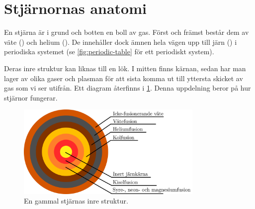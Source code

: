 \section{Stjärnornas anatomi}
En stjärna är i grund och botten en boll av gas. Först och främst består dem av väte () och helium (). De innehåller dock ämnen hela vägen upp till järn () i periodiska systemet (se \vref{fig:periodic-table} för ett periodiskt system).

Deras inre struktur kan liknas till en lök. I mitten finns kärnan, sedan har man lager av olika gaser och plasman för att sista komma ut till yttersta skicket av gas som vi ser utifrån. Ett diagram återfinns i \cref{fig:star-anatomy}. Denna uppdelning beror på hur stjärnor fungerar.

\begin{figure}[h!]
    \centering
    \includegraphics[width=0.8\textwidth]{img/star.png}
    \caption{En gammal stjärnas inre struktur.}
    \label{fig:star-anatomy}
\end{figure}